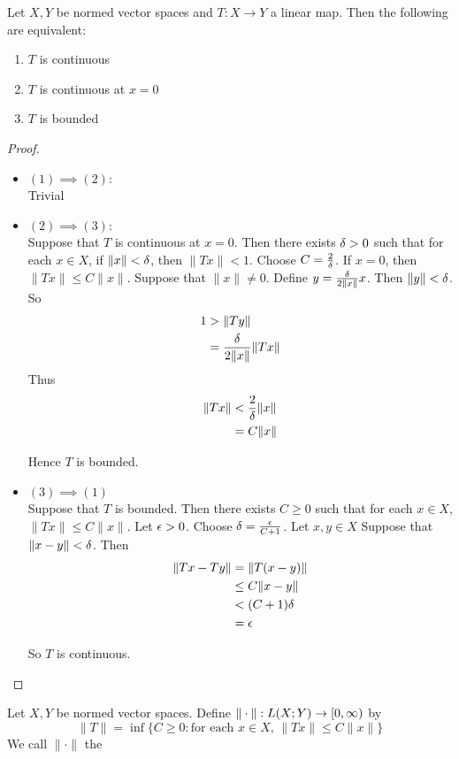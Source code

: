 \documentclass{book}
\begin{document}
	\begin{ex} 
		Let $X,Y$ be normed vector spaces and $T:X \rightarrow Y$ a linear map. Then the following are equivalent:
		\begin{enumerate}
			\item $T$ is continuous
			\item $T$ is continuous at $x=0$
			\item $T$ is bounded
		\end{enumerate}
	\end{ex}
	
	\begin{proof}\
		\begin{itemize}
		\item $(1) \implies (2)$:\\
		Trivial
		\item $(2) \implies (3)$:\\
		Suppose that $T$ is continuous at $x=0$. Then there exists $\delta>0$ such that for each $x \in X$, if $\|x \|< \delta$, then $\|Tx \|< 1$. Choose $C = \frac{2}{\delta}$. If $x=0$, then $\|Tx \|\leq C \|x \|$. Suppose that $\|x \|\neq 0$. Define $y = \frac{\delta}{2 \|x \|}x$. Then $\|y \|< \delta$. So 
		\begin{align*}
		1 
		&> \|Ty \|\\
		&= \frac{\delta}{2 \|x \|} \|Tx \|
		\end{align*}
		Thus 
		\begin{align*}
			\|Tx \|
			&< \frac{2}{\delta} \|x \| \\
			&=C \|x \|
		\end{align*}
		
		Hence $T$ is bounded.
		\item $(3) \implies (1)$\\
		Suppose that $T$ is bounded. Then there exists $C \geq 0$ such that for each $x \in X$, $\|Tx \|\leq C\|x \|$. Let $\epsilon >0$. Choose $\delta = \frac{\epsilon}{C+1}$. Let $x,y \in X$ Suppose that $\|x-y \|< \delta$. Then 
		\begin{align*}
			\|Tx-Ty \|
			& = \|T(x-y) \| \\
			& \leq C \|x-y \|\\
			&< (C+1) \delta\\ 
			&= \epsilon
		\end{align*}
		
		So $T$ is continuous.
		\end{itemize}
	\end{proof}
	
	\begin{defn} 
		Let $X,Y$ be normed vector spaces. Define $\|\cdot\|: L(X; Y)\rightarrow [0,\infty)$ by $$\|T\| = \inf \{C \geq 0: \text{for each }x \in X\text{, } \|Tx \|\leq C\|x\|\}$$ We call $\|\cdot \|$ the 
	\end{defn}
	
\end{document}
